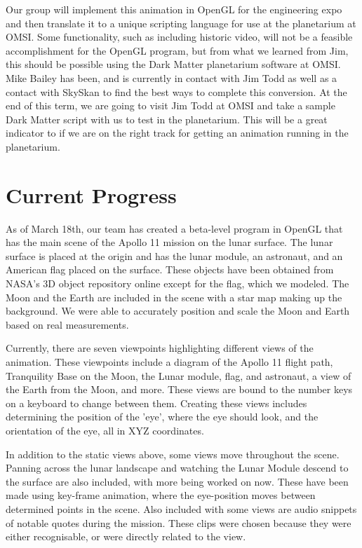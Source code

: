 \documentclass[onecolumn, draftclsnofoot,10pt, compsoc]{IEEEtran}
\begin{document}
Our group will implement this animation in OpenGL for the engineering expo and then translate it to a unique scripting language for use at the planetarium at OMSI. Some functionality, such as including historic video, will not be a feasible accomplishment for the OpenGL program, but from what we learned from Jim, this should be possible using the Dark Matter planetarium software at OMSI. Mike Bailey has been, and is currently in contact with Jim Todd as well as a contact with SkySkan to find the best ways to complete this conversion. At the end of this term, we are going to visit Jim Todd at OMSI and take a sample Dark Matter script with us to test in the planetarium. This will be a great indicator to if we are on the right track for getting an animation running in the planetarium. 

\section{Current Progress}

As of March 18th, our team has created a beta-level program in OpenGL that has the main scene of the Apollo 11 mission on the lunar surface. The lunar surface is placed at the origin and has the lunar module, an astronaut, and an American flag placed on the surface. These objects have been obtained from NASA's 3D object repository online except for the flag, which we modeled. The Moon and the Earth are included in the scene with a star map making up the background. We were able to accurately position and scale the Moon and Earth based on real measurements. 

Currently, there are seven viewpoints highlighting different views of the animation. These viewpoints include a diagram of the Apollo 11 flight path, Tranquility Base on the Moon, the Lunar module, flag, and astronaut, a view of the Earth from the Moon, and more. These views are bound to the number keys on a keyboard to change between them. Creating these views includes determining the position of the 'eye', where the eye should look, and the orientation of the eye, all in XYZ coordinates. 

In addition to the static views above, some views move throughout the scene. Panning across the lunar landscape and watching the Lunar Module descend to the surface are also included, with more being worked on now. These have been made using key-frame animation, where the eye-position moves between determined points in the scene. Also included with some views are audio snippets of notable quotes during the mission. These clips were chosen because they were either recognisable, or were directly related to the view. 
\end{document}
